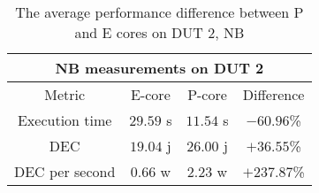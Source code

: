 
\begin{table}[H]
    \centering
    \begin{tabular}{|| c | c | c | c ||}
    \hline
    \multicolumn{4}{||c||}{NB measurements on DUT 2} \\ [0.5ex] \hline\hline
    Metric & E-core & P-core & Difference \\\hline
    Execution time & $29.59$ s & $11.54$ s & $-60.96$\% \\
    DEC & $19.04$ j & $26.00$ j & $+36.55$\% \\
    DEC per second & $0.66$ w & $2.23$ w & $+237.87$\% \\\hline
    \end{tabular}
    \caption{The average performance difference between P and E cores on DUT 2, NB}
    \label{tab:dut-2-exp-3-nb}
\end{table}










